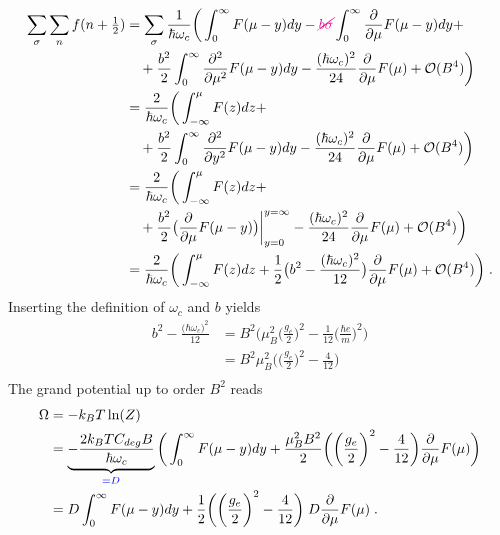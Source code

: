 %
\begin{align*}
\sum_{\sigma} \sum_{n} f(n+\tfrac12) &=\sum_{\sigma}
\frac{1}{\hbar \omega_{c}} 
\bigg(
\int_{0}^{\infty} F(\mu-y)dy - {\color{magenta} \cancel{b \sigma}} \int_{0}^{\infty} \frac{\partial }{\partial \mu}F(\mu-y)dy +\\
&\quad + \frac{b^{2}}{2}\int_{0}^{\infty} \frac{\partial^{2} }{\partial \mu^{2}}F(\mu-y)dy
 -\frac{(\hbar \omega_{c})^{2}}{24}\frac{\partial }{\partial \mu} 
 F(\mu)   
 +{\cal O}(B^{4})\bigg)\\
 &=
\frac{2}{\hbar \omega_{c}} 
\bigg(
\int_{-\infty}^{\mu} F(z)dz  +\\
&\quad + \frac{b^{2}}{2}\int_{0}^{\infty} \frac{\partial^{2} }{\partial y^{2}}F(\mu-y)dy
 -\frac{(\hbar \omega_{c})^{2}}{24}\frac{\partial }{\partial \mu}  F(\mu)   
 +{\cal O}(B^{4})\bigg)\\
  &=
\frac{2}{\hbar \omega_{c}} 
\bigg(
\int_{-\infty}^{\mu} F(z)dz  +\\
&\quad + \frac{b^{2}}{2}\big(\frac{\partial }{\partial \mu}F(\mu-y)\big)\bigg|_{y=0}^{y=\infty}
 -\frac{(\hbar \omega_{c})^{2}}{24}\frac{\partial }{\partial \mu}  F(\mu)   
 +{\cal O}(B^{4})\bigg)\\
   &=
\frac{2}{\hbar \omega_{c}} 
\bigg(
\int_{-\infty}^{\mu} F(z)dz 
 +\frac{1}{2}\big( b^{2}-\frac{(\hbar \omega_{c})^{2}}{12}\big)
 \frac{\partial }{\partial \mu}F(\mu)
 +{\cal O}(B^{4})\bigg)\;.
\end{align*}
%
Inserting the definition of $\omega_{c}$ and $b$
yields
%
\begin{align*}
b^{2} -\frac{\big(\hbar \omega_{c}\big)^{2}}{12} 
&=B^{2}\bigg( \mu_{B}^{2}\bigg(\frac{g_{e}}{2}\bigg)^{2} - \frac{1}{12}\bigg(\frac{\hbar e}{m}\bigg)^{2} \bigg)\\
&=B^{2}\mu_{B}^{2}\bigg( \bigg(\frac{g_{e}}{2}\bigg)^{2} - \frac{4}{12} \bigg)\\
\end{align*}
%
The grand potential up to order $B^{2}$ reads 
%
\begin{align*}
\Omega &= -k_{B}T \ln(Z)\\
&=\underbrace{-
\frac{2 k_{B} T C_{deg}B}{\hbar \omega_{c}} 
}_{\color{blue} = D}
\bigg(
\int_{0}^{\infty} F(\mu-y)dy  
 +\frac{\mu_{B}^{2}B^{2}}{2}\bigg(  \bigg(\frac{g_{e}}{2}\bigg)^{2} - \frac{4}{12}  \bigg)
 \frac{\partial }{\partial \mu}F(\mu)\bigg)\\
 &=
D  \int_{0}^{\infty} F(\mu-y)dy  
 +\frac{1}{2}\bigg(  \bigg(\frac{g_{e}}{2}\bigg)^{2} - \frac{4}{12}  \bigg)
\;D \frac{\partial }{\partial \mu} F(\mu)\;.
\end{align*}
